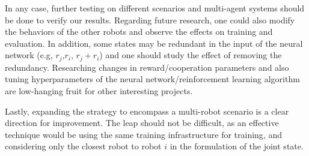 \documentclass[conference]{IEEEtran}
\begin{document}
In any case, further testing on different scenarios and multi-agent systems should be done to verify our results. Regarding future research, one could also modify the behaviors of the other robots and observe the effects on training and evaluation. In addition, some states may be redundant in the input of the neural network (e.g, $ r_j $,$ r_i $, $r_j+r_i$) and one should study the effect of removing the redundancy. Researching changes in reward/cooperation parameters and also tuning hyperparameters of the neural network/reinforcement learning algorithm are low-hanging fruit for other interesting projects. 

Lastly, expanding the strategy to encompass a multi-robot scenario is a clear direction for improvement. The leap should not be difficult, as an effective technique would be using the same training infrastructure for training, and considering only the closest robot to robot $i$ in the formulation of the joint state.



\end{document}
